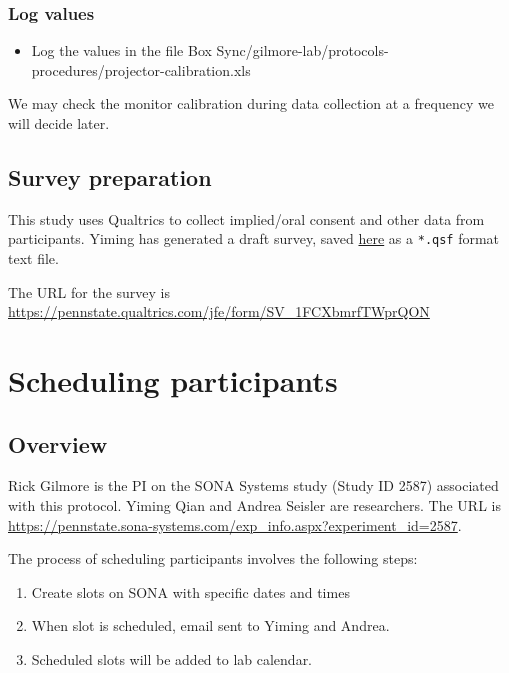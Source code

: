 \documentclass[]{article}
\providecommand{\tightlist}{%
  \setlength{\itemsep}{0pt}\setlength{\parskip}{0pt}}
\begin{document}
\hypertarget{log-values}{%
\subsubsection{Log values}\label{log-values}}

\begin{itemize}
\tightlist
\item
  Log the values in the file Box
  Sync/gilmore-lab/protocols-procedures/projector-calibration.xls
\end{itemize}

We may check the monitor calibration during data collection at a
frequency we will decide later.

\hypertarget{survey-preparation}{%
\subsection{Survey preparation}\label{survey-preparation}}

This study uses Qualtrics to collect implied/oral consent and other data
from participants. Yiming has generated a draft survey, saved
\href{qualtrics_survey.qsf}{here} as a \texttt{*.qsf} format text file.

The URL for the survey is
\url{https://pennstate.qualtrics.com/jfe/form/SV_1FCXbmrfTWprQON}

\hypertarget{scheduling-participants}{%
\section{Scheduling participants}\label{scheduling-participants}}

\hypertarget{overview}{%
\subsection{Overview}\label{overview}}

Rick Gilmore is the PI on the SONA Systems study (Study ID 2587)
associated with this protocol. Yiming Qian and Andrea Seisler are
researchers. The URL is
\url{https://pennstate.sona-systems.com/exp_info.aspx?experiment_id=2587}.

The process of scheduling participants involves the following steps:

\begin{enumerate}
\def\labelenumi{\arabic{enumi}.}
\tightlist
\item
  Create slots on SONA with specific dates and times
\item
  When slot is scheduled, email sent to Yiming and Andrea.
\item
  Scheduled slots will be added to lab calendar.
\end{enumerate}
\end{document}
